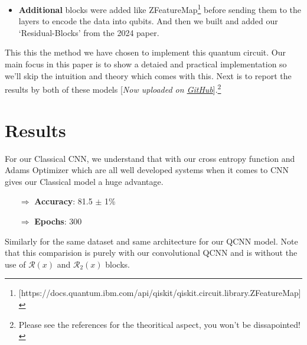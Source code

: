 \documentclass[a4paper]{article}
\begin{document}
\begin{itemize}
\begin{figure}[h]
\begin{subfigure}{.2\textwidth}
  \caption{$\mathcal{R}_2(x)$}
  \label{fig:sub2}
\end{subfigure}%
\begin{subfigure}{.2\textwidth}
  \centering
  \texttt{[image: assets/conv\\\_element.png]}
  \caption{$C$ Layer element}
  \label{fig:sub2}
\end{subfigure}%
\begin{subfigure}{.2\textwidth}
  \centering
  \texttt{[image: assets/pool\\\_element.png]}
  \caption{$P$ Layer element}
  \label{fig:sub2}
\end{subfigure}%
\label{fig:test}
\end{figure}
\item \textbf{Additional} blocks were added like ZFeatureMap\footnote{[https://docs.quantum.ibm.com/api/qiskit/qiskit.circuit.library.ZFeatureMap]} before sending them to the layers to encode the data into qubits. And then we built and added our `Residual-Blocks' from the 2024 paper.
\end{itemize}
This this the method we have chosen to implement this quantum circuit. Our main focus in this paper is to show a detaied and practical implementation so we'll skip the intuition and theory which comes with this. Next is to report the results by both of these models [\emph{Now uploaded on \href{https://github.com/f361015/Quantum-CNN-TicTacToe}{GitHub}}].\footnote{Please see the references for the theoritical aspect, you won't be dissapointed!}

\section*{Results}

For our Classical CNN, we understand that with our cross entropy function and Adams Optimizer which are all well developed systems when it comes to CNN gives our Classical model a huge advantage.

\begin{itemize}
\item[$\Rightarrow$] \textbf{Accuracy}: 81.5 $\pm$ 1\%
\item[$\Rightarrow$] \textbf{Epochs}: 300
\end{itemize}

Similarly for the same dataset and same architecture for our QCNN model. Note that this comparision is purely with our convolutional QCNN and is without the use of $\mathcal{R}(x)$ and $\mathcal{R}_2(x)$ blocks.
\end{document}
